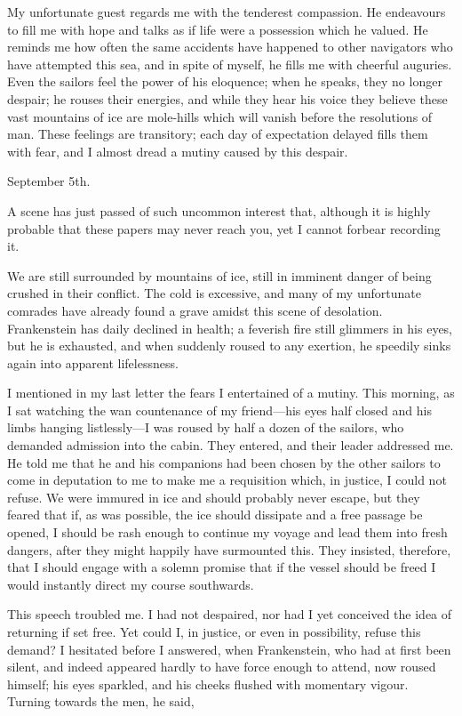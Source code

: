 \documentclass[12pt,openright]{book}
\begin{document}
My unfortunate guest regards me with the tenderest compassion. He endeavours to fill me with hope and talks as if life were a possession which he valued. He reminds me how often the same accidents have happened to other navigators who have attempted this sea, and in spite of myself, he fills me with cheerful auguries. Even the sailors feel the power of his eloquence; when he speaks, they no longer despair; he rouses their energies, and while they hear his voice they believe these vast mountains of ice are mole-hills which will vanish before the resolutions of man. These feelings are transitory; each day of expectation delayed fills them with fear, and I almost dread a mutiny caused by this despair.

September 5th.

A scene has just passed of such uncommon interest that, although it is highly probable that these papers may never reach you, yet I cannot forbear recording it.

We are still surrounded by mountains of ice, still in imminent danger of being crushed in their conflict. The cold is excessive, and many of my unfortunate comrades have already found a grave amidst this scene of desolation. Frankenstein has daily declined in health; a feverish fire still glimmers in his eyes, but he is exhausted, and when suddenly roused to any exertion, he speedily sinks again into apparent lifelessness.

I mentioned in my last letter the fears I entertained of a mutiny. This morning, as I sat watching the wan countenance of my friend—his eyes half closed and his limbs hanging listlessly—I was roused by half a dozen of the sailors, who demanded admission into the cabin. They entered, and their leader addressed me. He told me that he and his companions had been chosen by the other sailors to come in deputation to me to make me a requisition which, in justice, I could not refuse. We were immured in ice and should probably never escape, but they feared that if, as was possible, the ice should dissipate and a free passage be opened, I should be rash enough to continue my voyage and lead them into fresh dangers, after they might happily have surmounted this. They insisted, therefore, that I should engage with a solemn promise that if the vessel should be freed I would instantly direct my course southwards.

This speech troubled me. I had not despaired, nor had I yet conceived the idea of returning if set free. Yet could I, in justice, or even in possibility, refuse this demand? I hesitated before I answered, when Frankenstein, who had at first been silent, and indeed appeared hardly to have force enough to attend, now roused himself; his eyes sparkled, and his cheeks flushed with momentary vigour. Turning towards the men, he said,
\end{document}
